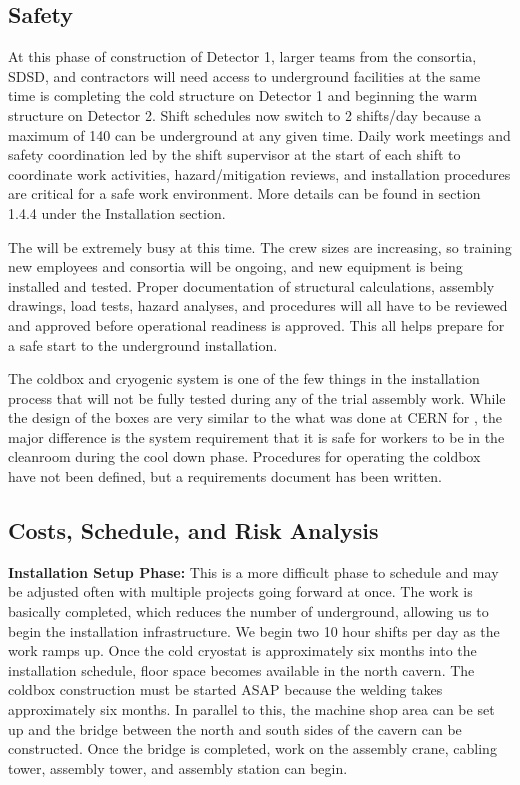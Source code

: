 \subsection{Safety}
\label{sec:fdsp-tc-infr-safety}
At this phase of construction of Detector 1, larger teams from the consortia, SDSD,  and contractors will need access to underground facilities at the same time  is completing the cold structure on Detector 1 and beginning the warm structure on Detector 2. Shift schedules now switch to 2 shifts/day because a maximum of 140  can be underground at any given time.  Daily work meetings and safety coordination led by the shift supervisor at the start of each shift to coordinate work activities, hazard/mitigation reviews, and installation procedures are critical for a safe work environment. More details can be found in section 1.4.4 under the Installation  section. 

The  will be extremely busy at this time. The crew sizes are increasing, so training new employees and consortia will be ongoing, and new equipment is being installed and tested. Proper documentation of structural calculations, assembly drawings, load tests, hazard analyses, and procedures will all have to be reviewed and approved before operational readiness is approved. This all helps prepare for a safe start to the underground installation. 

The coldbox and cryogenic system is one of the few things in the installation process that will not be fully tested during any of the trial assembly work. While the design of the boxes are very similar to the what was done at CERN for , the major difference is the system requirement that it is safe for workers to be in the cleanroom during the cool down phase. Procedures for operating the coldbox have not been defined, but a requirements document has been written.   

\subsection{Costs, Schedule, and Risk Analysis}
\label{sec:fdsp-tc-infr-cost}


{\bf Installation Setup Phase:} This is a more difficult phase to schedule and may be adjusted often with multiple projects going forward at once. The  work is basically completed, which reduces the number of  underground, allowing us to begin the installation infrastructure. We begin two 10 hour shifts per day as the work ramps up.  Once the cold cryostat is approximately six months into the installation schedule, floor space becomes available in the north cavern. The coldbox construction must be started ASAP because the welding takes approximately six months. In parallel to this, the machine shop area can be set up and the bridge between the north and south sides of the cavern can be constructed.  Once the bridge is completed, work on the assembly crane,  cabling tower,  assembly tower, and  assembly station can begin. 
    
